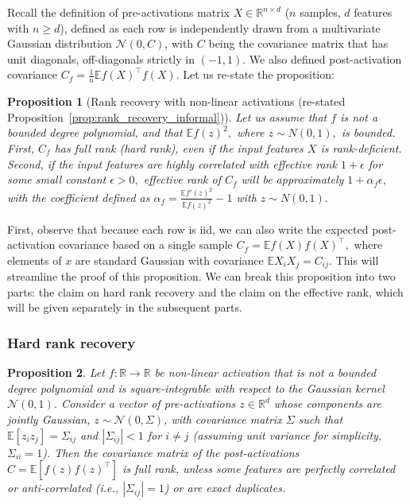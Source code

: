 \documentclass{article}
\newcommand{\R}{\mathbb{R}}
\newcommand{\E}{\mathbb{E}}
\newcommand{\AJ}[1]{\todo[color=green!30,size=\tiny]{AJ: #1}}
\newtheorem{proposition}{Proposition}[section]
\numberwithin{figure}{section}
\begin{document}
Recall the definition of pre-activations matrix $X \in \R^{n \times d}$ ($n$ samples, $d$ features with $n\ge d$), defined as each row is independently drawn from a multivariate Gaussian distribution $\mathcal{N}(0, C)$, with $C$ being the covariance matrix that has unit diagonals, off-diagonals strictly in $(-1,1)$. We also defined post-activation covariance $C_f = \frac1n \E f(X)^\top f(X).$ Let us re-state the proposition:

\begin{proposition}[Rank recovery with non-linear activations (re-stated Proposition~\ref{prop:rank_recovery_informal})]
Let us assume that  $f$ is not a bounded degree polynomial, and that $\E f(z)^2,$ where $z\sim N(0,1),$ is bounded. First, $C_f$ has full rank (hard rank), even if the input features $X$ is rank-deficient. Second, if the input features are highly correlated with effective rank $1+\epsilon$ for some small constant $\epsilon>0,$ effective rank of $C_f$ will be approximately  $1 + \alpha_f \epsilon,$ with the coefficient defined as $\alpha_f = \frac{\E f'(z)^2}{\E f(z)^2 } - 1$ with $z\sim N(0,1).$
\end{proposition}

First, observe that because each row is iid, we can also write the expected post-activation covariance based on a single sample $C_f = \E f(X) f(X)^\top,$ where elements of $x$ are standard Gaussian with covariance $\E X_i X_j = C_{ij}. $ This will streamline the proof of this proposition.  We can break this proposition into two parts: the claim on hard rank recovery and the claim on the effective rank, which will be given separately in the subsequent parts. 


\subsubsection*{Hard rank recovery}

\begin{proposition}
\label{prop:rank}
Let $f:\R\to\R$ be non-linear activation that is not a bounded degree polynomial and is square-integrable with respect to the Gaussian kernel $\mathcal{N}(0,1)$. Consider a vector of pre-activations $z\in\R^d$ whose components are jointly Gaussian, $z \sim \mathcal{N}(0, \Sigma)$, with covariance matrix $\Sigma$ such that $\E[z_i z_j]=\Sigma_{ij}$ and $|\Sigma_{ij}|<1$ for $i \neq j$ (assuming unit variance for simplicity, $\Sigma_{ii}=1$). Then the covariance matrix of the post-activations $C = \E[f(z)f(z)^\top]$ is full rank, unless some features are perfectly correlated or anti-correlated (i.e., $|\Sigma_{ij}|=1$) or are exact duplicates.
\end{proposition}
\end{document}
